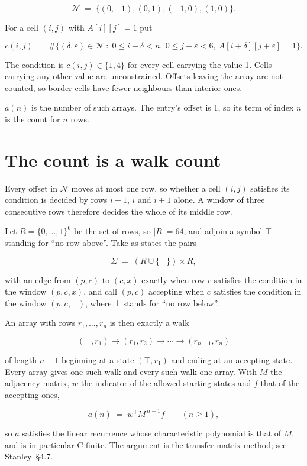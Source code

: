 \documentclass[11pt]{article}
\theoremstyle{definition}
\begin{document}
\[\mathcal{N} \;=\; \{(0,-1), (0,1), (-1,0), (1,0)\}.\]

For a cell $(i,j)$ with $A[i][j] = 1$ put

\[c(i,j) \;=\; \#\bigl\{(\delta,\varepsilon)\in\mathcal{N} \;:\; 0\le i+\delta<n,\ 0\le j+\varepsilon<6,\ A[i+\delta][j+\varepsilon] = 1\bigr\}.\]

The condition is $c(i,j) \in \{1, 4\}$ for every cell carrying the value 1. Cells carrying any other value are unconstrained. Offsets leaving the array are not counted, so border cells have fewer neighbours than interior ones.

$a(n)$ is the number of such arrays. The entry's offset is 1, so its term of index $n$ is the count for $n$ rows.

\section{The count is a walk count}

Every offset in $\mathcal{N}$ moves at most one row, so whether a cell $(i,j)$ satisfies its condition is decided by rows $i-1$, $i$ and $i+1$ alone. A window of three consecutive rows therefore decides the whole of its middle row.

Let $R = \{0,\dots,1\}^{6}$ be the set of rows, so $|R| = 64$, and adjoin a symbol $\top$ standing for ``no row above''. Take as states the pairs

\[\Sigma \;=\; (R \cup \{\top\}) \times R,\]

with an edge from $(p,c)$ to $(c,x)$ exactly when row $c$ satisfies the condition in the window $(p,c,x)$, and call $(p,c)$ accepting when $c$ satisfies the condition in the window $(p,c,\bot)$, where $\bot$ stands for ``no row below''.

An array with rows $r_1,\dots,r_n$ is then exactly a walk

\[(\top,r_1) \to (r_1,r_2) \to \cdots \to (r_{n-1},r_n)\]

of length $n-1$ beginning at a state $(\top,r_1)$ and ending at an accepting state. Every array gives one such walk and every such walk one array. With $M$ the adjacency matrix, $w$ the indicator of the allowed starting states and $f$ that of the accepting ones,

\[a(n) \;=\; w^{\mathsf T} M^{\,n-1} f \qquad (n \ge 1),\]

so $a$ satisfies the linear recurrence whose characteristic polynomial is that of $M$, and is in particular C-finite. The argument is the transfer-matrix method; see Stanley~\S4.7.
\end{document}
